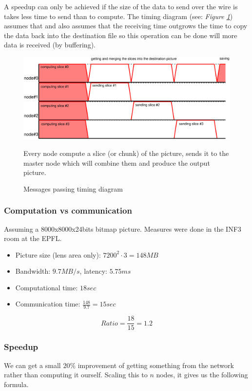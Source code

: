 \documentclass[10pt,a4paper]{article}
\begin{document}
A speedup can only be achieved if the size of the data to send over the wire is
takes less time to send than to compute. The timing diagram (see: \emph{Figure
\ref{fig:mpi}}) assumes that and also assumes that the receiving time outgrows
the time to copy the data back into the destination file so this operation can
be done will more data is received (by buffering).

\begin{figure}[h]
    \centering
    \includegraphics[width=0.9\linewidth]{../figures/mpi.eps}
    \caption{Messages passing timing diagram}{\small Every node compute a slice
    (or chunk) of the picture, sends it to the master node which will combine
    them and produce the output picture.}
    \label{fig:mpi}
\end{figure}

\subsubsection{Computation vs communication}
Assuming a 8000x8000x24bits bitmap picture. Measures were done in the INF3 room
at the EPFL.

\begin{itemize}
    \item Picture size (lens area only): $7200^2 \cdot 3 = 148 MB$
    \item Bandwidth: $9.7 MB/s$, latency: $5.75 ms$
    \item Computational time: $18 sec$
    \item Communication time: $\frac{148}{9.7} = 15 sec$
\end{itemize}

$$Ratio = \frac{18}{15} = 1.2$$

\subsubsection{Speedup}

We can get a small $20\%$ improvement of getting something from the network
rather than computing it ourself. Scaling this to $n$ nodes, it gives us the
following formula.
\end{document}
